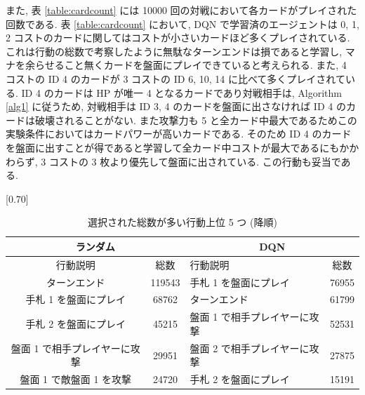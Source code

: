 \documentclass[twocolumn]{jarticle}
\begin{document}
  また,  表 \ref{table:cardcount} には 10000 回の対戦において各カードがプレイされた回数である. 表 \ref{table:cardcount} において, DQN で学習済のエージェントは 0, 1, 2 コストのカードに関してはコストが小さいカードほど多くプレイされている. これは行動の総数で考察したように無駄なターンエンドは損であると学習し, マナを余らせること無くカードを盤面にプレイできていると考えられる. 
  また, 4 コストの ID 4 のカードが 3 コストの ID 6, 10, 14 に比べて多くプレイされている. ID 4 のカードは HP が唯一 4 となるカードであり対戦相手は, Algorithm \ref{alg1} に従うため, 対戦相手は ID 3, 4 のカードを盤面に出さなければ ID 4 のカードは破壊されることがない. また攻撃力も 5 と全カード中最大であるためこの実験条件においてはカードパワーが高いカードである. そのため ID 4 のカードを盤面に出すことが得であると学習して全カード中コストが最大であるにもかかわらず, 3 コストの 3 枚より優先して盤面に出されている. この行動も妥当である.

  \begin{table}[t]
    \centering
    \caption{選択された総数が多い行動上位 5 つ (降順)}
    \vspace{-0.3cm}
    \label{table:actioncount}
    \scalebox{0.68}[0.70]{
      \begin{tabular}{|cc|cc|}
        \hline
        \multicolumn{2}{|c|}{ランダム}      & \multicolumn{2}{c|}{DQN}       \\ \hline
        \multicolumn{1}{|c|}{行動説明} & 総数 & \multicolumn{1}{l|}{行動説明} & 総数 \\ \hline \hline
        \multicolumn{1}{|c|}{ターンエンド}    & 119543  & \multicolumn{1}{l|}{手札 1 を盤面にプレイ}    & 76955  \\ \hline
        \multicolumn{1}{|c|}{手札 1 を盤面にプレイ}    & 68762  & \multicolumn{1}{l|}{ターンエンド}    & 61799  \\ \hline
        \multicolumn{1}{|c|}{手札 2 を盤面にプレイ}    & 45215  & \multicolumn{1}{l|}{盤面 1 で相手プレイヤーに攻撃}    & 52531  \\ \hline
        \multicolumn{1}{|c|}{盤面 1 で相手プレイヤーに攻撃}    & 29951  & \multicolumn{1}{l|}{盤面 2 で相手プレイヤーに攻撃}    & 27875  \\ \hline
        \multicolumn{1}{|c|}{盤面 1 で敵盤面 1 を攻撃}    & 24720  & \multicolumn{1}{l|}{手札 2 を盤面にプレイ}    & 15191  \\ \hline
        \end{tabular}
    }
  \end{table}
\end{document}
